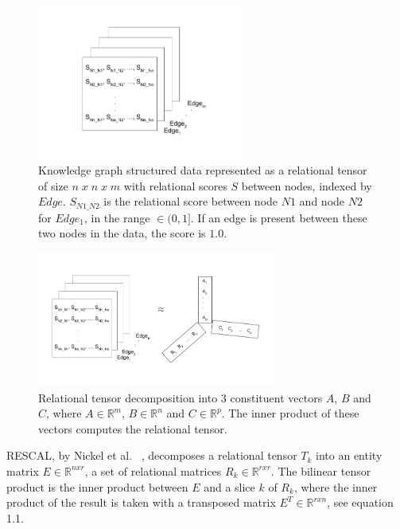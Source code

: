 \begin{figure}[H]
   	\centering
    	\includegraphics[width=0.6\textwidth, height=0.3\textheight]{relational_tensor.png}
	\captionsetup{justification=centering}
	\caption{Knowledge graph structured data represented as a relational tensor of size $ n \; x \; n \; x \; m $ with relational scores $ S $ between nodes, indexed by $ Edge $. $ S_{N1\_N2} $ is the relational score between node $ N1 $ and node $ N2 $ for $ Edge_1 $, in the range $ \in (0, 1] $. If an edge is present between these two nodes in the data, the score is $ 1.0 $.}
\end{figure}

\begin{figure}[H]
   	\centering
    	\includegraphics[width=0.7\textwidth, height=0.4\textwidth]{relational_tensor_decomposition}
	\captionsetup{justification=centering}
	\caption{Relational tensor decomposition into $ 3 $ constituent vectors $ A $, $ B $ and $ C $, where $ A \in \mathbb{R}^m $,  $ B \in \mathbb{R}^n $ and $ C \in \mathbb{R}^p $. The inner product of these vectors computes the relational tensor.}
\end{figure}

\noindent RESCAL, by Nickel et al.  \unskip~\citep{nickel2011three}, decomposes a relational tensor $ T_k $ into an entity matrix $ E  \in \mathbb{R}^{n x r} $, a set of relational matrices $ R_k \in \mathbb{R}^{rxr}$. The bilinear tensor product is the inner product between $ E $ and a slice $ k $ of $ R_k $, where the inner product of the result is taken with a transposed matrix $ E^T \in \mathbb{R}^{r x n} $, see equation 1.1.

